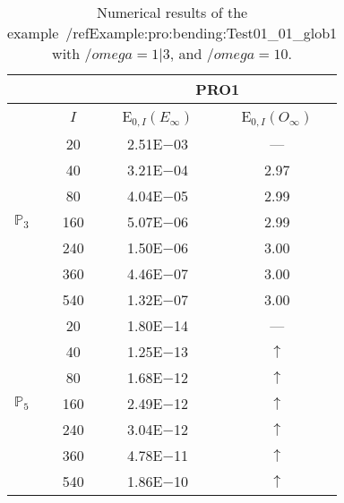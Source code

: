 \begin{table}[H]
\caption{Numerical results of the example~/ref{Example:pro:bending:Test01_01_glob1} with $/omega=1|3$, and $/omega=10$.}
\setlength{\tabcolsep}{5pt}
\centering
\begin{tabular}{@{}l c c c@{}}
\toprule
 &  & \multicolumn{2}{c}{PRO1}\\
\midrule
 & $I$ & E$_{0,I}(E_{\infty})$ & E$_{0,I}(O_{\infty})$\\
\midrule
\multirow{7}{*}{$\mathbb{P}_{3}$}
 & 20 & 2.51E$-$03 & ---\\
 & 40 & 3.21E$-$04 & 2.97\\
 & 80 & 4.04E$-$05 & 2.99\\
 & 160 & 5.07E$-$06 & 2.99\\
 & 240 & 1.50E$-$06 & 3.00\\
 & 360 & 4.46E$-$07 & 3.00\\
 & 540 & 1.32E$-$07 & 3.00\\
\midrule
\multirow{7}{*}{$\mathbb{P}_{5}$}
 & 20 & 1.80E$-$14 & ---\\
 & 40 & 1.25E$-$13 & $\uparrow$\\
 & 80 & 1.68E$-$12 & $\uparrow$\\
 & 160 & 2.49E$-$12 & $\uparrow$\\
 & 240 & 3.04E$-$12 & $\uparrow$\\
 & 360 & 4.78E$-$11 & $\uparrow$\\
 & 540 & 1.86E$-$10 & $\uparrow$\\
\bottomrule
\end{tabular}
\label{Table:pRO:test_01_01_test12_pro2}
\end{table}
